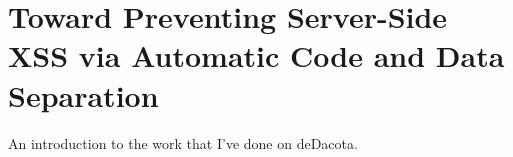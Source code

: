 \chapter{Toward Preventing Server-Side XSS via Automatic Code and Data Separation}
\label{dedacota}

An introduction to the work that I've done on deDacota.

